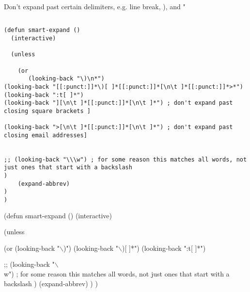 \documentclass[11pt]{article}
\begin{document}
\label{sec:org0129037}
Don't expand past certain delimiters, e.g. line break, ), and "


\begin{verbatim}

(defun smart-expand ()
  (interactive)

  (unless

    (or
       (looking-back "\)\n*")
(looking-back "[[:punct:]]*\)[ ]*[[:punct:]]*[\n\t ]*[[:punct:]]*>*")
(looking-back ":t[ ]*")
(looking-back "][\n\t ]*[[:punct:]]*[\n\t ]*") ; don't expand past closing square brackets ]

(looking-back ">[\n\t ]*[[:punct:]]*[\n\t ]*") ; don't expand past closing email addresses]


;; (looking-back "\\\w") ; for some reason this matches all words, not just ones that start with a backslash
)
    (expand-abbrev)
)
)

\end{verbatim}




(defun smart-expand ()
  (interactive)

(unless

    (or
       (looking-back "$\backslash$)\n*")
(looking-back "$\backslash$)[ ]*")
(looking-back ":t[ ]*")

;; (looking-back "$\backslash$\\w") ; for some reason this matches all words, not just ones that start with a backslash
)
    (expand-abbrev)
)
)
\end{document}
